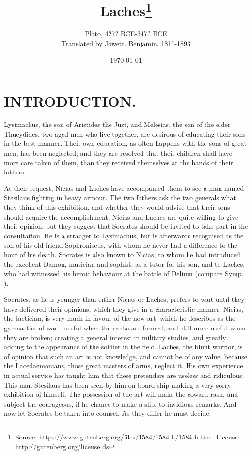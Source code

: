 \documentclass[11pt,letter]{book}
\begin{document}
\title{Laches\thanks{Source: https://www.gutenberg.org/files/1584/1584-h/1584-h.htm. License: http://gutenberg.org/license ds}}
\date{\today}
\author{Plato, 427? BCE-347? BCE\\ Translated by Jowett, Benjamin, 1817-1893}
\maketitle

\setcounter{tocdepth}{1}
\tableofcontents
\renewcommand{\baselinestretch}{1.0}
\normalsize

\section{
      INTRODUCTION.
    }
\par  Lysimachus, the son of Aristides the Just, and Melesias, the son of the elder Thucydides, two aged men who live together, are desirous of educating their sons in the best manner. Their own education, as often happens with the sons of great men, has been neglected; and they are resolved that their children shall have more care taken of them, than they received themselves at the hands of their fathers.

\par  At their request, Nicias and Laches have accompanied them to see a man named Stesilaus fighting in heavy armour. The two fathers ask the two generals what they think of this exhibition, and whether they would advise that their sons should acquire the accomplishment. Nicias and Laches are quite willing to give their opinion; but they suggest that Socrates should be invited to take part in the consultation. He is a stranger to Lysimachus, but is afterwards recognised as the son of his old friend Sophroniscus, with whom he never had a difference to the hour of his death. Socrates is also known to Nicias, to whom he had introduced the excellent Damon, musician and sophist, as a tutor for his son, and to Laches, who had witnessed his heroic behaviour at the battle of Delium (compare Symp. ).

\par  Socrates, as he is younger than either Nicias or Laches, prefers to wait until they have delivered their opinions, which they give in a characteristic manner. Nicias, the tactician, is very much in favour of the new art, which he describes as the gymnastics of war—useful when the ranks are formed, and still more useful when they are broken; creating a general interest in military studies, and greatly adding to the appearance of the soldier in the field. Laches, the blunt warrior, is of opinion that such an art is not knowledge, and cannot be of any value, because the Lacedaemonians, those great masters of arms, neglect it. His own experience in actual service has taught him that these pretenders are useless and ridiculous. This man Stesilaus has been seen by him on board ship making a very sorry exhibition of himself. The possession of the art will make the coward rash, and subject the courageous, if he chance to make a slip, to invidious remarks. And now let Socrates be taken into counsel. As they differ he must decide.
\end{document}
